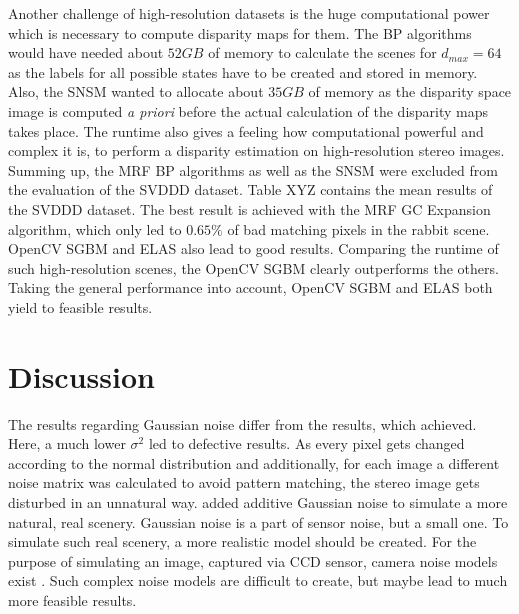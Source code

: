 \noindent Another challenge of high-resolution datasets is the huge computational power which is necessary to compute disparity maps for them.
The BP algorithms would have needed about $52 GB$ of memory to calculate the scenes for $d_{max} = 64$ as the labels for all possible states have to be created and stored in memory.
Also, the SNSM wanted to allocate about $35 GB$ of memory as the disparity space image is computed \textit{a priori} before the actual calculation of the disparity maps takes place.
The runtime also gives a feeling how computational powerful and complex it is, to perform a disparity estimation on high-resolution stereo images.
Summing up, the MRF BP algorithms as well as the SNSM were excluded from the evaluation of the SVDDD dataset.
\newline\newline\noindent Table XYZ contains the mean results of the SVDDD dataset.
The best result is achieved with the MRF GC Expansion algorithm, which only led to $0.65\%$ of bad matching pixels in the rabbit scene.
OpenCV SGBM and ELAS also lead to good results.
Comparing the runtime of such high-resolution scenes, the OpenCV SGBM clearly outperforms the others.
Taking the general performance into account, OpenCV SGBM and ELAS both yield to feasible results.





\section{Discussion}




The results regarding Gaussian noise differ from the results, which \citeauthor{richardt2010real} \citep{richardt2010real} achieved.
Here, a much lower $\sigma^2$ led to defective results.
As every pixel gets changed according to the normal distribution and additionally, for each image a different noise matrix was calculated to avoid pattern matching, the stereo image gets disturbed in an unnatural way.
\citeauthor{richardt2010real} added additive Gaussian noise to simulate a more natural, real scenery.
Gaussian noise is a part of sensor noise, but a small one.
To simulate such real scenery, a more realistic model should be created.
For the purpose of simulating an image, captured via CCD sensor, camera noise models exist \citep{liu2006noise}.
Such complex noise models are difficult to create, but maybe lead to much more feasible results.


























